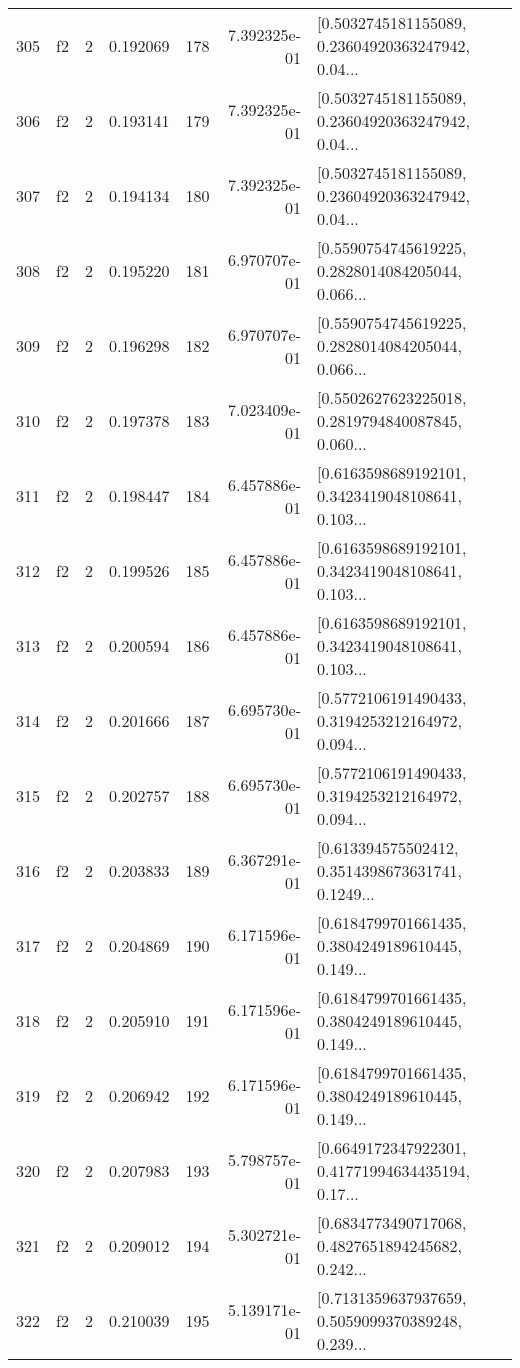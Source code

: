 \begin{tabular}{lllrlrl}
305 &  f2 &   2 &  0.192069 &  178 &  7.392325e-01 &  [0.5032745181155089, 0.23604920363247942, 0.04... \\
306 &  f2 &   2 &  0.193141 &  179 &  7.392325e-01 &  [0.5032745181155089, 0.23604920363247942, 0.04... \\
307 &  f2 &   2 &  0.194134 &  180 &  7.392325e-01 &  [0.5032745181155089, 0.23604920363247942, 0.04... \\
308 &  f2 &   2 &  0.195220 &  181 &  6.970707e-01 &  [0.5590754745619225, 0.2828014084205044, 0.066... \\
309 &  f2 &   2 &  0.196298 &  182 &  6.970707e-01 &  [0.5590754745619225, 0.2828014084205044, 0.066... \\
310 &  f2 &   2 &  0.197378 &  183 &  7.023409e-01 &  [0.5502627623225018, 0.2819794840087845, 0.060... \\
311 &  f2 &   2 &  0.198447 &  184 &  6.457886e-01 &  [0.6163598689192101, 0.3423419048108641, 0.103... \\
312 &  f2 &   2 &  0.199526 &  185 &  6.457886e-01 &  [0.6163598689192101, 0.3423419048108641, 0.103... \\
313 &  f2 &   2 &  0.200594 &  186 &  6.457886e-01 &  [0.6163598689192101, 0.3423419048108641, 0.103... \\
314 &  f2 &   2 &  0.201666 &  187 &  6.695730e-01 &  [0.5772106191490433, 0.3194253212164972, 0.094... \\
315 &  f2 &   2 &  0.202757 &  188 &  6.695730e-01 &  [0.5772106191490433, 0.3194253212164972, 0.094... \\
316 &  f2 &   2 &  0.203833 &  189 &  6.367291e-01 &  [0.613394575502412, 0.3514398673631741, 0.1249... \\
317 &  f2 &   2 &  0.204869 &  190 &  6.171596e-01 &  [0.6184799701661435, 0.3804249189610445, 0.149... \\
318 &  f2 &   2 &  0.205910 &  191 &  6.171596e-01 &  [0.6184799701661435, 0.3804249189610445, 0.149... \\
319 &  f2 &   2 &  0.206942 &  192 &  6.171596e-01 &  [0.6184799701661435, 0.3804249189610445, 0.149... \\
320 &  f2 &   2 &  0.207983 &  193 &  5.798757e-01 &  [0.6649172347922301, 0.41771994634435194, 0.17... \\
321 &  f2 &   2 &  0.209012 &  194 &  5.302721e-01 &  [0.6834773490717068, 0.4827651894245682, 0.242... \\
322 &  f2 &   2 &  0.210039 &  195 &  5.139171e-01 &  [0.7131359637937659, 0.5059099370389248, 0.239... \\

\end{tabular}
